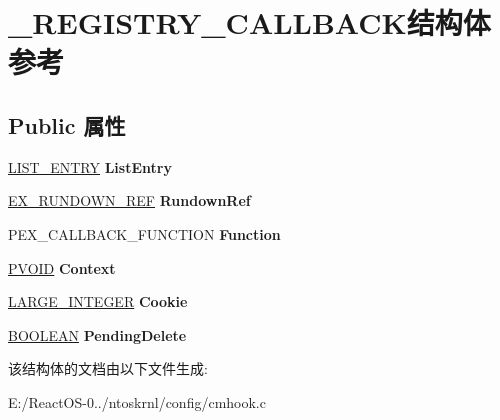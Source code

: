 \hypertarget{struct___r_e_g_i_s_t_r_y___c_a_l_l_b_a_c_k}{}\section{\+\_\+\+R\+E\+G\+I\+S\+T\+R\+Y\+\_\+\+C\+A\+L\+L\+B\+A\+C\+K结构体 参考}
\label{struct___r_e_g_i_s_t_r_y___c_a_l_l_b_a_c_k}
\subsection*{Public 属性}
\begin{DoxyCompactItemize}
\item 
\mbox{\label{struct___r_e_g_i_s_t_r_y___c_a_l_l_b_a_c_k_a66b11f7e9f9d535a456f437cce86b288}} 
\hyperlink{struct___l_i_s_t___e_n_t_r_y}{L\+I\+S\+T\+\_\+\+E\+N\+T\+RY} {\bfseries List\+Entry}
\item 
\mbox{\label{struct___r_e_g_i_s_t_r_y___c_a_l_l_b_a_c_k_aa06aa4fe392c7fec5da2847c10ac5e17}} 
\hyperlink{struct___e_x___r_u_n_d_o_w_n___r_e_f}{E\+X\+\_\+\+R\+U\+N\+D\+O\+W\+N\+\_\+\+R\+EF} {\bfseries Rundown\+Ref}
\item 
\mbox{\label{struct___r_e_g_i_s_t_r_y___c_a_l_l_b_a_c_k_aa602fc25e8bbb677acd19642f89cb591}} 
P\+E\+X\+\_\+\+C\+A\+L\+L\+B\+A\+C\+K\+\_\+\+F\+U\+N\+C\+T\+I\+ON {\bfseries Function}
\item 
\mbox{\label{struct___r_e_g_i_s_t_r_y___c_a_l_l_b_a_c_k_af1d1eee0ca3d9df8ef062fbc518cb5eb}} 
\hyperlink{interfacevoid}{P\+V\+O\+ID} {\bfseries Context}
\item 
\mbox{\label{struct___r_e_g_i_s_t_r_y___c_a_l_l_b_a_c_k_a40db1270ee516859c6592905b5ece49f}} 
\hyperlink{union___l_a_r_g_e___i_n_t_e_g_e_r}{L\+A\+R\+G\+E\+\_\+\+I\+N\+T\+E\+G\+ER} {\bfseries Cookie}
\item 
\mbox{\label{struct___r_e_g_i_s_t_r_y___c_a_l_l_b_a_c_k_afec1e30d49b6b4a82444fab85dcb5611}} 
\hyperlink{_processor_bind_8h_a112e3146cb38b6ee95e64d85842e380a}{B\+O\+O\+L\+E\+AN} {\bfseries Pending\+Delete}
\end{DoxyCompactItemize}


该结构体的文档由以下文件生成\+:\begin{DoxyCompactItemize}
\item 
E\+:/\+React\+O\+S-\/0../ntoskrnl/config/cmhook.\+c\end{DoxyCompactItemize}
